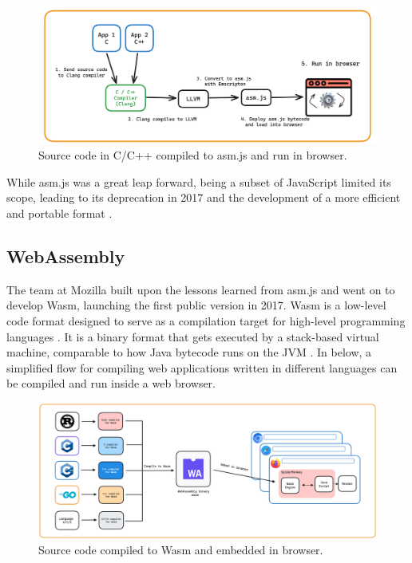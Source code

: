 \documentclass[
  table]{report}
\begin{document}
\begin{figure}[H]
\centering
  \includegraphics{assets/asm.js-figure.png}
\caption{Source code in C/C++ compiled to asm.js and run in browser.}\label{fig:asm-figure}
\end{figure}

While asm.js was a great leap forward, being a subset of JavaScript
limited its scope, leading to its deprecation in 2017 and the
development of a more efficient and portable format
\citep{webassembly.orgFAQWebAssembly}.

\subsection{WebAssembly}

The team at Mozilla built upon the lessons learned from asm.js and went
on to develop \ac{Wasm}, launching the first public version in 2017.
\ac{Wasm} is a low-level code format designed to serve as a compilation
target for high-level programming languages
\citep{haasBringingWebSpeed2017}. It is a binary format that gets
executed by a stack-based virtual machine, comparable to how Java
bytecode runs on the \ac{JVM} \citep{haasBringingWebSpeed2017}. In
 below, a simplified flow for compiling web
applications written in different languages can be compiled and run
inside a web browser.

\begin{figure}[H]
\centering
  \includegraphics{assets/wasm-browser.png}
  \caption{Source code compiled to \ac{Wasm} and embedded in browser.}
  \label{fig:wasm-browser}
\end{figure}
\end{document}
